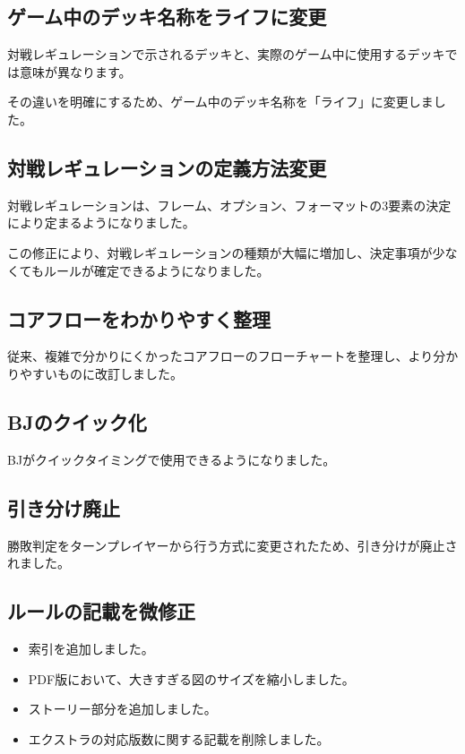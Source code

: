 \documentclass[letterpaper,10pt,dvipdfmx]{sphinxmanual}
\begin{document}
\subsection{ゲーム中のデッキ名称をライフに変更}
\label{\detokenize{revision-history/7th:id3}}
\sphinxAtStartPar
対戦レギュレーションで示されるデッキと、実際のゲーム中に使用するデッキでは意味が異なります。

\sphinxAtStartPar
その違いを明確にするため、ゲーム中のデッキ名称を「ライフ」に変更しました。


\subsection{対戦レギュレーションの定義方法変更}
\label{\detokenize{revision-history/7th:id4}}
\sphinxAtStartPar
対戦レギュレーションは、フレーム、オプション、フォーマットの3要素の決定により定まるようになりました。

\sphinxAtStartPar
この修正により、対戦レギュレーションの種類が大幅に増加し、決定事項が少なくてもルールが確定できるようになりました。


\subsection{コアフローをわかりやすく整理}
\label{\detokenize{revision-history/7th:id5}}
\sphinxAtStartPar
従来、複雑で分かりにくかったコアフローのフローチャートを整理し、より分かりやすいものに改訂しました。


\subsection{BJのクイック化}
\label{\detokenize{revision-history/7th:bj}}
\sphinxAtStartPar
BJがクイックタイミングで使用できるようになりました。


\subsection{引き分け廃止}
\label{\detokenize{revision-history/7th:id6}}
\sphinxAtStartPar
勝敗判定をターンプレイヤーから行う方式に変更されたため、引き分けが廃止されました。


\subsection{ルールの記載を微修正}
\label{\detokenize{revision-history/7th:id7}}\begin{itemize}
\item {} 
\sphinxAtStartPar
索引を追加しました。

\item {} 
\sphinxAtStartPar
PDF版において、大きすぎる図のサイズを縮小しました。

\item {} 
\sphinxAtStartPar
ストーリー部分を追加しました。

\item {} 
\sphinxAtStartPar
エクストラの対応版数に関する記載を削除しました。

\end{itemize}



\renewcommand{\indexname}{索引}
\printindex
\end{document}

